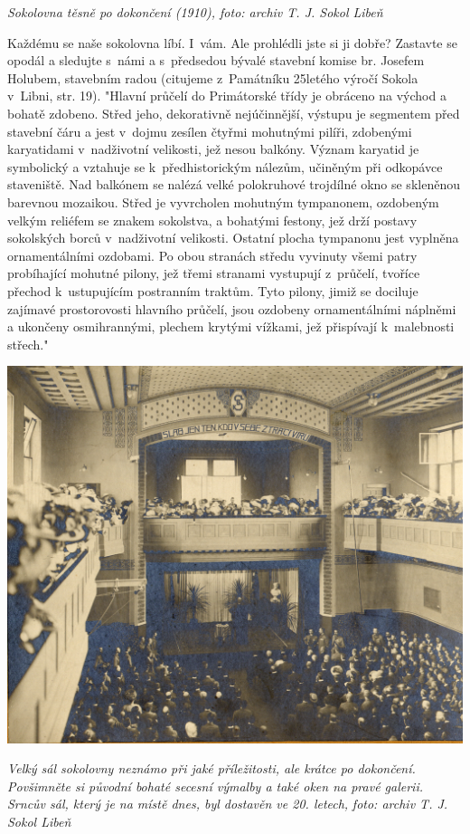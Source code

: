 \documentclass[a5paper, 11pt, twoside]{article}
\begin{document}
\textit{Sokolovna těsně po dokončení (1910), foto: archiv T. J. Sokol
Libeň}

Každému se naše sokolovna líbí. I~vám. Ale prohlédli jste si ji dobře?
Zastavte se opodál a sledujte s~námi a s~předsedou bývalé stavební
komise br. Josefem Holubem, stavebním radou (citujeme z~Památníku
25letého výročí Sokola v~Libni, str. 19). "Hlavní průčelí do Primátorské
třídy je obráceno na východ a bohatě zdobeno. Střed jeho, dekorativně
nejúčinnější, výstupu je segmentem před stavební čáru a jest v~dojmu
zesílen čtyřmi mohutnými pilíři, zdobenými karyatidami v~nadživotní
velikosti, jež nesou balkóny. Význam karyatid je symbolický a vztahuje
se k~předhistorickým nálezům, učiněným při odkopávce staveniště. Nad
balkónem se nalézá velké polokruhové trojdílné okno se skleněnou
barevnou mozaikou. Střed je vyvrcholen mohutným tympanonem, ozdobeným
velkým reliéfem se znakem sokolstva, a bohatými festony, jež drží
postavy sokolských borců v~nadživotní velikosti. Ostatní plocha
tympanonu jest vyplněna ornamentálními ozdobami. Po obou stranách středu
vyvinuty všemi patry probíhající mohutné pilony, jež třemi stranami
vystupují z~průčelí, tvoříce přechod k~ustupujícím postranním traktům.
Tyto pilony, jimiž se dociluje zajímavé prostorovosti hlavního průčelí,
jsou ozdobeny ornamentálními náplněmi a ukončeny osmihrannými, plechem
krytými vížkami, jež přispívají k~malebnosti střech."

 \includegraphics[width=\textwidth]{img/20_velky_sal.jpg}

\textit{Velký sál sokolovny neznámo při jaké příležitosti, ale krátce po
dokončení. Povšimněte si původní bohaté secesní výmalby a také oken na
pravé galerii. Srncův sál, který je na místě dnes, byl dostavěn ve 20.
letech,} \textit{foto: archiv T. J. Sokol Libeň}
\end{document}
